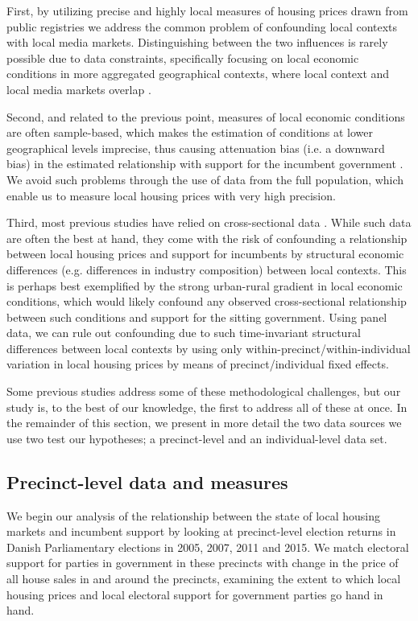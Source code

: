 \documentclass[12pt,a4paper]{article}
\begin{document}
	First, by utilizing precise and highly local measures of housing prices drawn from public registries we address the common problem of confounding local contexts with local media markets. Distinguishing between the two influences is rarely possible due to data constraints, specifically focusing on local economic conditions in more aggregated geographical contexts, where local context and local media markets overlap \citep[][]{bisgaard2016reconsidering}.  
	
	Second, and related to the previous point, measures of local economic conditions are often sample-based, which makes the estimation of conditions at lower geographical levels imprecise, thus causing attenuation bias (i.e. a downward bias) in the estimated relationship with support for the incumbent government \citep[][]{healy2017presidential}. We avoid such problems through the use of data from the full population, which enable us to measure local housing prices with very high precision.
	
	Third, most previous studies have relied on cross-sectional data \citep[e.g.,][]{reeves2012ecologies, ansolabehere2014mecro, books1999contextual}. While such data are often the best at hand, they come with the risk of confounding a relationship between local housing prices and support for incumbents by structural economic differences (e.g. differences in industry composition) between local contexts. This is perhaps best exemplified by the strong urban-rural gradient in local economic conditions, which would likely confound any observed cross-sectional relationship between such conditions and support for the sitting government. Using panel data, we can rule out confounding due to such time-invariant structural differences between local contexts by using only within-precinct/within-individual variation in local housing prices by means of precinct/individual fixed effects.
	
	Some previous studies address some of these methodological challenges, but our study is, to the best of our knowledge, the first to address all of these at once. In the remainder of this section, we present in more detail the two data sources we use two test our hypotheses; a precinct-level and an individual-level data set.
	
	\subsection{Precinct-level data and measures}\label{precinctlevel}
	We begin our analysis of the relationship between the state of local housing markets and incumbent support by looking at precinct-level election returns in Danish Parliamentary elections in 2005, 2007, 2011 and 2015. We match electoral support for parties in government in these precincts with change in the price of all house sales in and around the precincts, examining the extent to which local housing prices and local electoral support for government parties go hand in hand.
	
\end{document}
